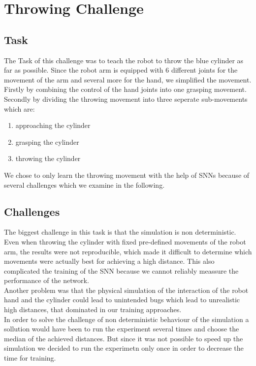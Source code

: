 \section{Throwing Challenge}
\subsection{Task}
The Task of this challenge was to teach the robot to throw the blue cylinder as far as possible. Since the robot arm is equipped with 6 different joints for the movement of the arm and several more for the hand, we simplified the movement. Firstly by combining the control of the hand joints into one grasping movement. Secondly by dividing the throwing movement into three seperate sub-movements which are:
 \begin{enumerate}
\item approaching the cylinder
\item grasping the cylinder
\item throwing the cylinder
\end{enumerate}
We chose to only learn the throwing movement with the help of SNNs because of several challenges which we examine in the following.

\subsection{Challenges}
\label{sec:challenges}
The biggest challenge in this task is that the simulation is non deterministic. Even when throwing the cylinder with fixed pre-defined movements of the robot arm, the results were not reproducible, which made it difficult to determine which movements were actually best for achieving a high distance. This also complicated the training of the SNN because we cannot reliably meassure the performance of the network.\\
Another problem was that the physical simulation of the interaction of the robot hand and the cylinder could lead to unintended bugs which lead to unrealistic high distances, that dominated in our training approaches.\\
In order to solve the challenge of non deterministic behaviour of the simulation a sollution would have been to run the experiment several times and choose the median of the achieved distances. But since it was not possible to speed up the simulation we decided to run the experimetn only once in order to decrease the time for training.\\




